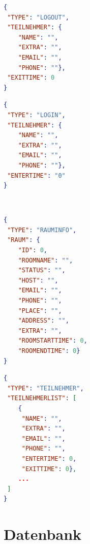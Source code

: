 \begin{minipage}[t]{0.45\linewidth}
\begin{lstlisting}[language=json, label={lst:anmeldung}, caption={anmeldung.json}]
{
 "TYPE": "LOGOUT",
 "TEILNEHMER": {
	"NAME": "",
	"EXTRA": "",
	"EMAIL": "",
	"PHONE": ""},
 "EXITTIME": 0
}
\end{lstlisting}
\end{minipage}
\qquad
\begin{minipage}[t]{0.45\linewidth}
\begin{lstlisting}[language=json,label={lst:abmeldung}, caption={abmeldung.json}]
{
 "TYPE": "LOGIN",
 "TEILNEHMER": {
	"NAME": "",
	"EXTRA": "",
	"EMAIL": "",
	"PHONE": ""},
 "ENTERTIME": "0"
}
\end{lstlisting}
\end{minipage}
\\
\begin{minipage}[t]{0.45\linewidth}
\begin{lstlisting}[language=json, label={lst:rauminfo}, caption={rauminfo.json}]
{
 "TYPE": "RAUMINFO",
 "RAUM": {
	"ID": 0,
	"ROOMNAME": "",
	"STATUS": "",
	"HOST": "",
	"EMAIL": "",
	"PHONE": "",
	"PLACE": "",
	"ADDRESS": "",
	"EXTRA": "",
	"ROOMSTARTTIME": 0,
	"ROOMENDTIME": 0}
}
\end{lstlisting}
\end{minipage}
\qquad
\begin{minipage}[t]{0.45\linewidth}
\begin{lstlisting}[language=json, label={lst:teilnehmer}, caption={teilnehmer.json}]
{
 "TYPE": "TEILNEHMER",
 "TEILNEHMERLIST": [
	{
	 "NAME": "",
	 "EXTRA": "",
 	 "EMAIL": "",
 	 "PHONE": "",
 	 "ENTERTIME": 0,
	 "EXITTIME": 0},
	...
 ]
}
\end{lstlisting}
\end{minipage}
\label{sec:MQTT Service}
\section{Datenbank}
\label{sec:Datenbank}

\begin{table}[]
\caption{Struktur der Datenbanktabelle dbParticipant}
\label{tab:dbParticipant}
\centering
{}
\end{table}


